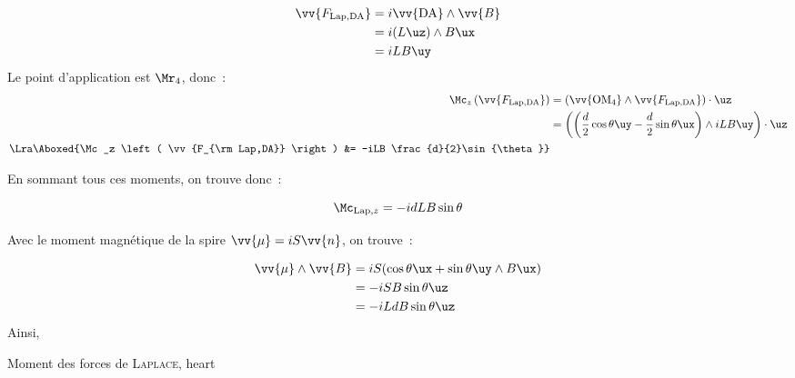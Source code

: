 \documentclass[../main/main.tex]{subfiles}
\begin{document}
\begin{hide}
  \begin{align*}
    \vv{F_{\rm Lap,DA}}
      &= i \vv{\rm DA}\wedge \vv{B}
    \\
      &= i (L\uz)\wedge B\ux
    \\
      &= iLB\uy
  \end{align*}
  Le point d'application est $\Mr_4$, donc~:
  \begin{align*}
    \Mc_z \left( \vv{F_{\rm Lap,DA}} \right)
      &= \left( \vv{\rm OM_4} \wedge \vv{F_{\rm Lap,DA}} \right)\cdot \uz
    \\
      &= \left( 
        \left( 
          \frac{d}{2}\cos{\theta}\uy
          - \frac{d}{2}\sin{\theta}\ux
        \right)\wedge iLB\uy
      \right)\cdot \uz
    \\\Lra 
    \Aboxed{\Mc_z \left( \vv{F_{\rm Lap,DA}} \right)
      &= -iLB \frac{d}{2}\sin{\theta}}
  \end{align*}
\end{hide}
\noindent
En sommant tous ces moments, on trouve donc~:
\begin{hide}
  \[
    \Mc_{\mathrm{Lap},z} = -idLB\sin{\theta}
  \]
\end{hide}
\noindent
Avec le moment magnétique de la spire $\vv{\mu} = iS \vv{n}$, on trouve~:
\begin{hide}
  \begin{align*}
    \vv{\mu}\wedge \vv{B}
      &= iS (\cos{\theta}\ux+\sin{\theta}\uy \wedge B\ux)
      \\
      &= -iSB\sin{\theta}\uz
      \\
      &= -iLdB\sin{\theta}\uz
  \end{align*}
  Ainsi,
\end{hide}
\begin{tprop}{Moment des forces de \textsc{Laplace}, heart}
\end{tprop}
\end{document}
